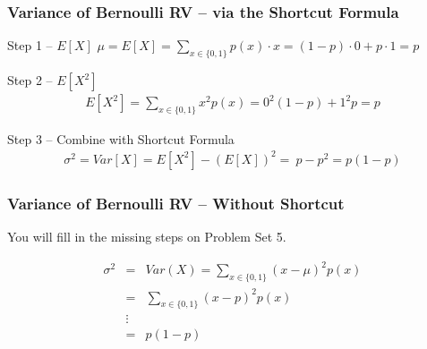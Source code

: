\documentclass[handout]{beamer}
\begin{document}


\begin{frame}
\frametitle{Variance of Bernoulli RV -- via the Shortcut Formula}

\begin{block}{Step 1 -- $E[X]$} 
$\mu = E[X] = \displaystyle \sum_{x \in \{0,1\}} p(x) \cdot x = (1-p) \cdot 0 + p \cdot 1 = p$
\end{block}

\pause

\begin{block}{Step 2 -- $E[X^2]$} 
\begin{eqnarray*}
	E[X^2] = \sum_{x \in \{0,1\}} x^2 p(x) = 0^2 (1-p) + 1^2 p = p
\end{eqnarray*}
\end{block}

\pause

\begin{block}{Step 3 -- Combine with Shortcut Formula} 
\begin{eqnarray*}
	\sigma^2 = Var[X] = E[X^2] - \left(E[X]\right)^2 = \ p - p^2 =  p(1-p)
\end{eqnarray*}
\end{block}


\end{frame}



\begin{frame}
\frametitle{Variance of Bernoulli RV -- Without Shortcut}

\alert{You will fill in the missing steps on Problem Set 5.}

\begin{eqnarray*}
	\sigma^2 &=& Var(X) = \sum_{x \in \{0,1\}} (x - \mu)^2 p(x)\\
	 &=& \sum_{x \in \{0,1\}} (x - p)^2 p(x)\\
	 &\vdots &\\ 
	 &=&p(1-p)
\end{eqnarray*}



\end{frame}
\end{document}
